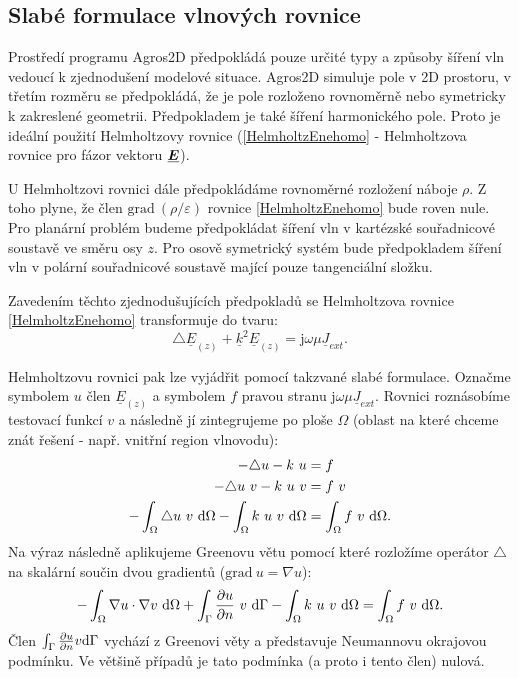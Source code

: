 \documentclass[12pt,a4paper,oneside]{article}
\numberwithin{equation}{section} %
\numberwithin{figure}{section} %
\numberwithin{table}{section} %
\newcommand{\mj}{\mathrm{j}} %
\renewcommand{\vec}[1]{\mbox{\boldmath$#1$}} %
\newcommand{\faz}[1]{{\underline{#1}}} %
\newcommand{\grad}{\mathrm{grad}\ }
\begin{document}
\subsection{Slabé formulace vlnových rovnice}
Prostředí programu Agros2D předpokládá pouze určité typy a způsoby šíření vln vedoucí k zjednodušení modelové situace. Agros2D simuluje pole v 2D prostoru, v třetím rozměru se předpokládá, že je pole rozloženo rovnoměrně nebo symetricky k zakreslené geometrii. Předpokladem je také šíření harmonického pole. Proto je ideální použití Helmholtzovy rovnice (\ref{HelmholtzEnehomo} - Helmholtzova rovnice pro fázor vektoru $\faz{\vec{E}}$).

U Helmholtzovi rovnici dále předpokládáme rovnoměrné rozložení náboje $\rho$. Z toho plyne, že člen $\grad \! \! (\rho / \varepsilon)$ rovnice \ref{HelmholtzEnehomo} bude roven nule. Pro planární problém budeme předpokládat šíření vln v kartézské souřadnicové soustavě ve směru osy $z$. Pro osově symetrický systém bude předpokladem šíření vln v polární souřadnicové soustavě mající pouze tangenciální složku.

Zavedením těchto zjednodušujících předpokladů se Helmholtzova rovnice \ref{HelmholtzEnehomo} transformuje do tvaru:
\begin{equation}
\label{HelmEasy}
\triangle \faz{E} _{(z)} + \faz{k} ^2 \faz{E} _{(z)} = \mj \omega \mu \faz{J} _{ext} .
\end{equation}

Helmholtzovu rovnici pak lze vyjádřit pomocí takzvané slabé formulace. Označme symbolem $u$ člen $\faz{E} _{(z)}$ a symbolem $f$ pravou stranu $\mj \omega \mu \faz{J} _{ext}$. Rovnici roznásobíme testovací funkcí $v$ a následně jí zintegrujeme po ploše $\Omega$ (oblast na které chceme znát řešení - např. vnitřní region vlnovodu):
\begin{subequations}
\label{Poisson}
\begin{align}
- \triangle u - k ~ u &= f
\\
- \triangle u ~ v - k ~ u ~ v &= f ~ v
\\
- \int _{\Omega} \triangle u ~ v ~ \mathrm{d} \Omega - \int _{\Omega} k ~ u ~ v ~ \mathrm{d} \Omega &= \int _{\Omega} f ~ v ~ \mathrm{d} \Omega .
\end{align}
\end{subequations}
Na výraz následně aplikujeme Greenovu větu pomocí které rozložíme operátor $\triangle$ na skalární součin dvou gradientů ($\grad u = \nabla u$):
\begin{equation}
\label{Green}
- \int _{\Omega} \nabla u \cdot \nabla v ~ \mathrm{d} \Omega + \int _{\Gamma} \frac{\partial u}{\partial n} ~ v ~ \mathrm{d} \Gamma - \int _{\Omega} k ~ u ~ v ~ \mathrm{d} \Omega = \int _{\Omega} f ~ v ~ \mathrm{d} \Omega .
\end{equation}
Člen $\int _{\Gamma} \frac{\partial u}{\partial n} v \mathrm{d} \Gamma$ vychází z Greenovi věty a představuje Neumannovu okrajovou podmínku. Ve většině případů je tato podmínka (a proto i tento člen) nulová.
\end{document}
